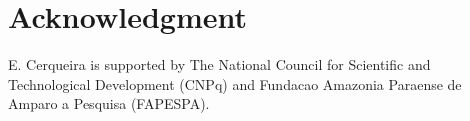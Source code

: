 \documentclass{acm_proc_article-sp}
\begin{document}
\section*{Acknowledgment}
E. Cerqueira is supported by The National Council for Scientific and Technological Development (CNPq) and Fundacao Amazonia Paraense de Amparo a Pesquisa (FAPESPA).


%

%
%

\balancecolumns
\end{document}
